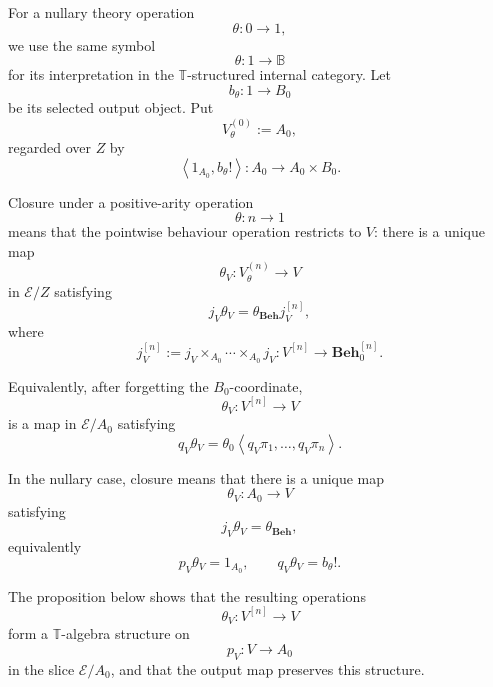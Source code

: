 \begin{definition}
    For a nullary theory operation
    \[
        \theta:0\to1,
    \]
    we use the same symbol
    \[
        \theta:1\to\mathbb B
    \]
    for its interpretation in the \(\mathbb T\)-structured internal category.
    Let
    \[
        b_\theta:1\to B_0
    \]
    be its selected output object. Put
    \[
        V^{(0)}_\theta:=A_0,
    \]
    regarded over \(Z\) by
    \[
        \left\langle
            1_{A_0},
            b_\theta!
        \right\rangle:
        A_0\to A_0\times B_0.
    \]

    Closure under a positive-arity operation
    \[
        \theta:n\to1
    \]
    means that the pointwise behaviour operation restricts to \(V\):
    there is a unique map
    \[
        \theta_V:
        V^{(n)}_\theta\to V
    \]
    in \(\mathcal E/Z\) satisfying
    \[
        j_V\theta_V
        =
        \theta_{\mathbf{Beh}}j_V^{[n]},
    \]
    where
    \[
        j_V^{[n]}
        :=
        j_V\times_{A_0}\cdots\times_{A_0}j_V:
        V^{[n]}
        \to
        \mathbf{Beh}_0^{[n]}.
    \]

    Equivalently, after forgetting the \(B_0\)-coordinate,
    \[
        \theta_V:V^{[n]}\to V
    \]
    is a map in \(\mathcal E/A_0\) satisfying
    \[
        q_V\theta_V
        =
        \theta_0
        \left\langle
            q_V\pi_1,
            \dots,
            q_V\pi_n
        \right\rangle.
    \]

    In the nullary case, closure means that there is a unique map
    \[
        \theta_V:A_0\to V
    \]
    satisfying
    \[
        j_V\theta_V
        =
        \theta_{\mathbf{Beh}},
    \]
    equivalently
    \[
        p_V\theta_V=1_{A_0},
        \qquad
        q_V\theta_V=b_\theta!.
    \]

    The proposition below shows that the resulting operations
    \[
        \theta_V:V^{[n]}\to V
    \]
    form a \(\mathbb T\)-algebra structure on
    \[
        p_V:V\to A_0
    \]
    in the slice \(\mathcal E/A_0\), and that the output map preserves this
    structure.
\end{definition}

